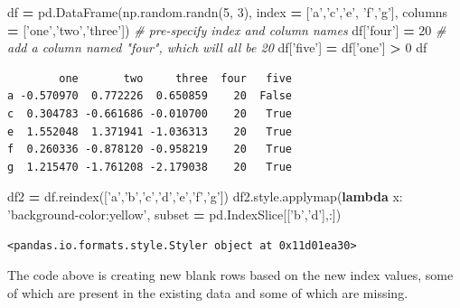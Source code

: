 \documentclass[
  letterpaper,
]{scrbook}
\newenvironment{Shaded}{\begin{snugshade}}{\end{snugshade}}
\newcommand{\CommentTok}[1]{\textcolor[rgb]{0.56,0.35,0.01}{\textit{#1}}}
\newcommand{\DecValTok}[1]{\textcolor[rgb]{0.00,0.00,0.81}{#1}}
\newcommand{\KeywordTok}[1]{\textcolor[rgb]{0.13,0.29,0.53}{\textbf{#1}}}
\newcommand{\NormalTok}[1]{#1}
\newcommand{\OperatorTok}[1]{\textcolor[rgb]{0.81,0.36,0.00}{\textbf{#1}}}
\newcommand{\StringTok}[1]{\textcolor[rgb]{0.31,0.60,0.02}{#1}}
\begin{document}
\begin{Shaded}
\begin{Highlighting}[]
\NormalTok{df }\OperatorTok{=}\NormalTok{ pd.DataFrame(np.random.randn(}\DecValTok{5}\NormalTok{, }\DecValTok{3}\NormalTok{), index }\OperatorTok{=}\NormalTok{ [}\StringTok{'a'}\NormalTok{,}\StringTok{'c'}\NormalTok{,}\StringTok{'e'}\NormalTok{, }\StringTok{'f'}\NormalTok{,}\StringTok{'g'}\NormalTok{], columns }\OperatorTok{=}\NormalTok{ [}\StringTok{'one'}\NormalTok{,}\StringTok{'two'}\NormalTok{,}\StringTok{'three'}\NormalTok{]) }\CommentTok{# pre-specify index and column names}
\NormalTok{df[}\StringTok{'four'}\NormalTok{] }\OperatorTok{=} \DecValTok{20} \CommentTok{# add a column named "four", which will all be 20}
\NormalTok{df[}\StringTok{'five'}\NormalTok{] }\OperatorTok{=}\NormalTok{ df[}\StringTok{'one'}\NormalTok{] }\OperatorTok{>} \DecValTok{0}
\NormalTok{df}
\end{Highlighting}
\end{Shaded}

\begin{verbatim}
        one       two     three  four   five
a -0.570970  0.772226  0.650859    20  False
c  0.304783 -0.661686 -0.010700    20   True
e  1.552048  1.371941 -1.036313    20   True
f  0.260336 -0.878120 -0.958219    20   True
g  1.215470 -1.761208 -2.179038    20   True
\end{verbatim}

\begin{Shaded}
\begin{Highlighting}[]
\NormalTok{df2 }\OperatorTok{=}\NormalTok{ df.reindex([}\StringTok{'a'}\NormalTok{,}\StringTok{'b'}\NormalTok{,}\StringTok{'c'}\NormalTok{,}\StringTok{'d'}\NormalTok{,}\StringTok{'e'}\NormalTok{,}\StringTok{'f'}\NormalTok{,}\StringTok{'g'}\NormalTok{])}
\NormalTok{df2.style.applymap(}\KeywordTok{lambda}\NormalTok{ x: }\StringTok{'background-color:yellow'}\NormalTok{, subset }\OperatorTok{=}\NormalTok{ pd.IndexSlice[[}\StringTok{'b'}\NormalTok{,}\StringTok{'d'}\NormalTok{],:])}
\end{Highlighting}
\end{Shaded}

\begin{verbatim}
<pandas.io.formats.style.Styler object at 0x11d01ea30>
\end{verbatim}

The code above is creating new blank rows based on the new index values, some of which are present in the existing data and some of which are missing.
\end{document}
